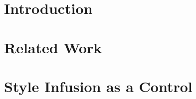 \documentclass[ twoside,
openright,
titlepage,
numbers=noenddot,%
                headinclude,
                footinclude,
                cleardoublepage=empty,
                abstract=on,
                BCOR=5mm,
                paper=letter,
                fontsize=12pt
                ]{scrreprt}
\begin{document}
\frenchspacing
\raggedbottom
{} %
\pagestyle{plain}
% 


\cleardoublepage
\cleardoublepage
\cleardoublepage
\cleardoublepage
\cleardoublepage
\cleardoublepage
\pagestyle{scrheadings}
\chapter{Introduction}\label{chp:intro}


\ctparttext{
    \lipsum[1]
}
\chapter{Related Work}\label{chp:relworks}


\ctparttext{
    \lipsum[2]
}
\chapter{Style Infusion as a Control}\label{chp:style_infusion}







\end{document}
